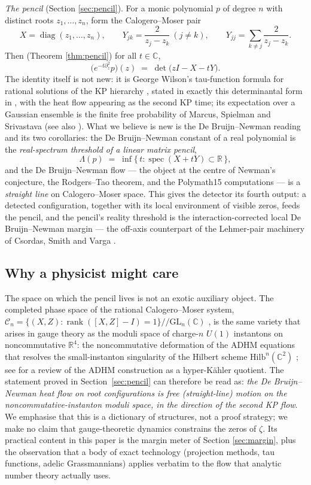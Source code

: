 \documentclass[11pt]{amsart}
\theoremstyle{remark}
\newcommand{\R}{\mathbb{R}}
\newcommand{\C}{\mathbb{C}}
\newcommand{\CM}{\mathcal{C}}
\begin{document}
\emph{The pencil} (Section \ref{sec:pencil}). For a monic polynomial $p$ of degree $n$ with distinct roots $z_1,\dots,z_n$, form the Calogero--Moser pair
\[
X=\operatorname{diag}(z_1,\dots,z_n),\qquad
Y_{jk}=\frac{2}{z_j-z_k}\ (j\ne k),\qquad
Y_{jj}=\sum_{k\ne j}\frac{2}{z_j-z_k}.
\]
Then (Theorem \ref{thm:pencil}) for all $t\in\C$,
\[
\bigl(e^{-t\partial_z^2}p\bigr)(z) \;=\; \det\bigl(zI-X-tY\bigr).
\]
The identity itself is not new: it is George Wilson's tau-function formula for rational solutions of the KP hierarchy \cite{Wilson}, stated in exactly this determinantal form in \cite[\S 6.3]{KMG}, with the heat flow appearing as the second KP time; its expectation over a Gaussian ensemble is the finite free probability of Marcus, Spielman and Srivastava \cite{MSS} (see also \cite{HallHo}). What we believe is new is the De Bruijn--Newman reading and its two corollaries: the De Bruijn--Newman constant of a real polynomial is the \emph{real-spectrum threshold of a linear matrix pencil},
\[
\Lambda(p)\;=\;\inf\{\,t:\operatorname{spec}(X+tY)\subset\R\,\},
\]
and the De Bruijn--Newman flow --- the object at the centre of Newman's conjecture, the Rodgers--Tao theorem, and the Polymath15 computations --- is a \emph{straight line} on Calogero--Moser space. This gives the detector its fourth output: a detected configuration, together with its local environment of visible zeros, feeds the pencil, and the pencil's reality threshold is the interaction-corrected local De Bruijn--Newman margin --- the off-axis counterpart of the Lehmer-pair machinery of Csordas, Smith and Varga \cite{CSV}.

\subsection{Why a physicist might care}
The space on which the pencil lives is not an exotic auxiliary object. The completed phase space of the rational Calogero--Moser system, $\CM_n=\{(X,Z): \operatorname{rank}([X,Z]-I)=1\}/\!/\mathrm{GL}_n(\C)$ \cite{Wilson,KKS}, is the same variety that arises in gauge theory as the moduli space of charge-$n$ $U(1)$ instantons on noncommutative $\R^4$: the noncommutative deformation of the ADHM equations \cite{ADHM} that resolves the small-instanton singularity of the Hilbert scheme $\mathrm{Hilb}^n(\C^2)$ \cite{NS,Nakajima}; see \cite{DHKM} for a review of the ADHM construction as a hyper-K\"ahler quotient. The statement proved in Section~\ref{sec:pencil} can therefore be read as: \emph{the De Bruijn--Newman heat flow on root configurations is free (straight-line) motion on the noncommutative-instanton moduli space, in the direction of the second KP flow}. We emphasise that this is a dictionary of structures, not a proof strategy; we make no claim that gauge-theoretic dynamics constrains the zeros of $\zeta$. Its practical content in this paper is the margin meter of Section \ref{sec:margin}, plus the observation that a body of exact technology (projection methods, tau functions, adelic Grassmannians) applies verbatim to the flow that analytic number theory actually uses.
\end{document}
